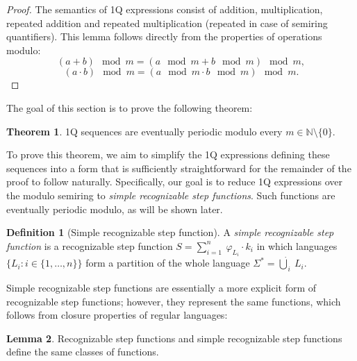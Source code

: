 \documentclass[en]{pracamgr}
\theoremstyle{definition}
\newtheorem{definition}{Definition}[section]
\newtheorem{theorem}{Theorem}[section]
\newtheorem{lemma}[theorem]{Lemma}
\begin{document}
\begin{proof}
    The semantics of 1Q expressions consist of addition, multiplication, repeated addition and repeated multiplication (repeated in case of semiring quantifiers). This lemma follows directly from the properties of operations modulo:
    $$(a + b) \mod m = (a \mod m + b \mod m) \mod m,$$
    $$(a \cdot b) \mod m = (a \mod m \cdot b \mod m) \mod m.$$
\end{proof}

The goal of this section is to prove the following theorem:

\begin{theorem}
    \label{1QSequencesPeriodic}
    1Q sequences are eventually periodic modulo every $m \in \mathbb{N} \setminus \{0\}$.
\end{theorem}

To prove this theorem, we aim to simplify the 1Q expressions defining these sequences into a form that is sufficiently straightforward for the remainder of the proof to follow naturally. Specifically, our goal is to reduce 1Q expressions over the modulo semiring to \emph{simple recognizable step functions}. Such functions are eventually periodic modulo, as will be shown later.

\begin{definition}[Simple recognizable step function]
    \label{DefSimpleRecStepFun}
    A \textit{simple recognizable step function} is a recognizable step function $S = \sum_{i = 1}^{n} \ \varphi_{L_i} \cdot k_i$ in which languages $\{L_i : i \in \{1,\ldots,n\}\}$ form a partition of the whole language $\Sigma^* = \dot{\bigcup}_i \ L_i$.
\end{definition}

Simple recognizable step functions are essentially a more explicit form of recognizable step functions; however, they represent the same functions, which follows from closure properties of regular languages:

\begin{lemma}
    \label{RecEqSimpleRec}
    Recognizable step functions and simple recognizable step functions define the same classes of functions.
\end{lemma}
\end{document}
